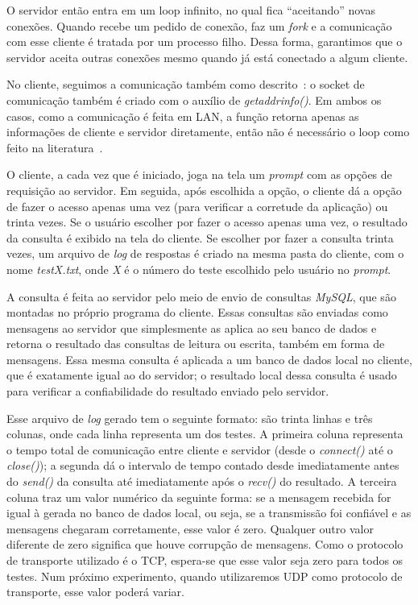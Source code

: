 \documentclass[12pt,a4paper]{article}
\begin{document}
O servidor então entra em um loop infinito, no qual fica “aceitando” novas conexões. Quando recebe um pedido de conexão, faz um {\it fork} e a comunicação com esse cliente é tratada por um processo filho. Dessa forma, garantimos que o servidor aceita outras conexões mesmo quando já está conectado a algum cliente.

No cliente, seguimos a comunicação também como descrito~\cite{hall19beej}: o socket de comunicação também é criado com o auxílio de {\it getaddrinfo()}. Em ambos os casos, como a comunicação é feita em LAN, a função retorna apenas as informações de cliente e servidor diretamente, então não é necessário o loop como feito na literatura~\cite{hall19beej}.

O cliente, a cada vez que é iniciado, joga na tela um {\it prompt} com as opções de requisição ao servidor. Em seguida, após escolhida a opção, o cliente dá a opção de fazer o acesso apenas uma vez (para verificar a corretude da aplicação) ou trinta vezes. Se o usuário escolher por fazer o acesso apenas uma vez, o resultado da consulta é exibido na tela do cliente. Se escolher por fazer a consulta trinta vezes, um arquivo de {\it log} de respostas é criado na mesma pasta do cliente, com o nome {\it testX.txt}, onde {\it X} é o número do teste escolhido pelo usuário no {\it prompt}.

A consulta é feita ao servidor pelo meio de envio de consultas {\it MySQL}, que são montadas no próprio programa do cliente. Essas consultas são enviadas como mensagens ao servidor que simplesmente as aplica ao seu banco de dados e retorna o resultado das consultas de leitura ou escrita, também em forma de mensagens. Essa mesma consulta é aplicada a um banco de dados local no cliente, que é exatamente igual ao do servidor; o resultado local dessa consulta é usado para verificar a confiabilidade do resultado enviado pelo servidor.

Esse arquivo de {\it log} gerado tem o seguinte formato: são trinta linhas e três colunas, onde cada linha representa um dos testes. A primeira coluna representa o tempo total de comunicação entre cliente e servidor (desde o {\it connect()} até o {\it close()}); a segunda dá o intervalo de tempo contado desde imediatamente antes do {\it send()} da consulta até imediatamente após o {\it recv()} do resultado. A terceira coluna traz um valor numérico da seguinte forma: se a mensagem recebida for igual à gerada no banco de dados local, ou seja, se a transmissão foi confiável e as mensagens chegaram corretamente, esse valor é zero. Qualquer outro valor diferente de zero significa que houve corrupção de mensagens.  Como o protocolo de transporte utilizado é o TCP, espera-se que esse valor seja zero para todos os testes. Num próximo experimento, quando utilizaremos UDP como protocolo de transporte, esse valor poderá variar.
\end{document}
